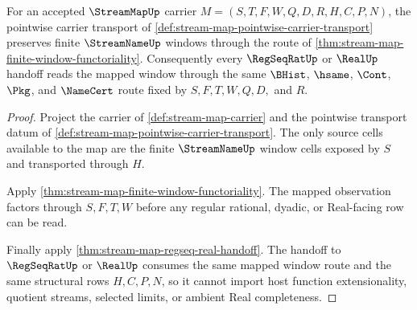 \begin{theorem}
\label{thm:stream-map-window-functoriality}
For an accepted $\StreamMapUp$ carrier $M=(S,T,F,W,Q,D,R,H,C,P,N)$, the pointwise carrier transport of \autoref{def:stream-map-pointwise-carrier-transport} preserves finite $\StreamNameUp$ windows through the route of \autoref{thm:stream-map-finite-window-functoriality}. Consequently every $\RegSeqRatUp$ or $\RealUp$ handoff reads the mapped window through the same $\BHist$, $\hsame$, $\Cont$, $\Pkg$, and $\NameCert$ route fixed by $S,F,T,W,Q,D,$ and $R$.
\end{theorem}
\begin{proof}
Project the carrier of \autoref{def:stream-map-carrier} and the pointwise transport datum of \autoref{def:stream-map-pointwise-carrier-transport}. The only source cells available to the map are the finite $\StreamNameUp$ window cells exposed by $S$ and transported through $H$.

Apply \autoref{thm:stream-map-finite-window-functoriality}. The mapped observation factors through $S,F,T,W$ before any regular rational, dyadic, or Real-facing row can be read.

Finally apply \autoref{thm:stream-map-regseq-real-handoff}. The handoff to $\RegSeqRatUp$ or $\RealUp$ consumes the same mapped window route and the same structural rows $H,C,P,N$, so it cannot import host function extensionality, quotient streams, selected limits, or ambient Real completeness.
\end{proof}

